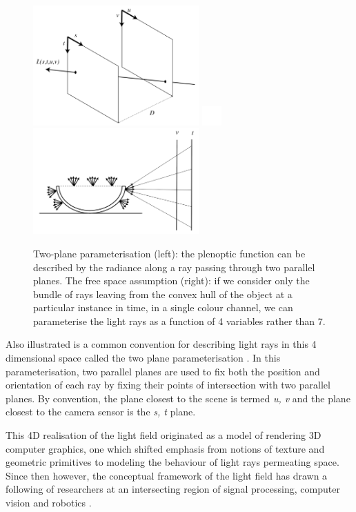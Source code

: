 \begin{figure}[htbp]
    \centering
    \includegraphics[width=2.5in]{images/2pp.png}
    \label{convexhull}
    \includegraphics[width=0.3in]{images/blank.png}
    \includegraphics[width=2.5in]{images/convexhull.png}
    
    \caption[The two-plane parameterisation and the free-space assumption]{Two-plane parameterisation (left): the plenoptic function can be described by the radiance along a ray passing through two parallel planes. The free space assumption (right): if we consider only the bundle of rays leaving from the convex hull of the object at a particular instance in time, in a single colour channel, we can parameterise the light rays as a function of 4 variables rather than 7.}
    
    
\end{figure}

Also illustrated is a common convention for describing light rays in this 4 dimensional space called the two plane parameterisation \cite{gortler1996lumigraph}. In this parameterisation, two parallel planes are used to fix both the position and orientation of each ray by fixing their points of intersection with two parallel planes. By convention, the plane closest to the scene is termed \textit{u, v} and the plane closest to the camera sensor is the \textit{s, t} plane.

This 4D realisation of the light field originated as a model of rendering 3D computer graphics, one which shifted emphasis from notions of texture and geometric primitives to modeling the behaviour of light rays permeating space. Since then however, the conceptual framework of the light field has drawn a following of researchers at an intersecting region of signal processing, computer vision and robotics \cite{dansereau2014phd}. 

